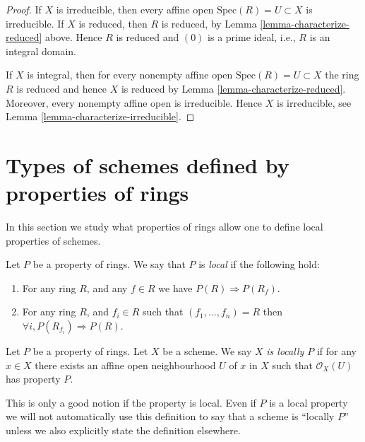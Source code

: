 \begin{proof}
If $X$ is irreducible, then every affine open $\text{Spec}(R) = U \subset X$
is irreducible. If $X$ is reduced, then $R$ is reduced, by
Lemma \ref{lemma-characterize-reduced} above. Hence $R$ is reduced
and $(0)$ is a prime ideal, i.e., $R$ is an integral domain.

\medskip\noindent
If $X$ is integral, then for every nonempty affine open
$\text{Spec}(R) = U \subset X$ the ring $R$ is reduced
and hence $X$ is reduced by Lemma \ref{lemma-characterize-reduced}.
Moreover, every nonempty affine open is irreducible.
Hence $X$ is irreducible, see Lemma \ref{lemma-characterize-irreducible}.
\end{proof}















\section{Types of schemes defined by properties of rings}
\label{section-properties-rings}

\noindent
In this section we study what properties of rings
allow one to define local properties of schemes.

\begin{definition}
\label{definition-property-local}
Let $P$ be a property of rings.
We say that $P$ is {\it local} if the following hold:
\begin{enumerate}
\item For any ring $R$, and any $f \in R$ we have
$P(R) \Rightarrow P(R_f)$.
\item For any ring $R$, and $f_i \in R$ such that
$(f_1, \ldots, f_n) = R$ then
$\forall i, P(R_{f_i}) \Rightarrow P(R)$.
\end{enumerate}
\end{definition}

\begin{definition}
\label{definition-locally-P}
Let $P$ be a property of rings. Let $X$ be a scheme.
We say $X$ {\it is locally $P$} if for any $x \in X$
there exists an affine open neighbourhood $U$ of $x$
in $X$ such that $\mathcal{O}_X(U)$ has property $P$.
\end{definition}

\noindent
This is only a good notion if the property is local.
Even if $P$ is a local property we will not
automatically use this definition to say that a scheme is
``locally $P$'' unless we also explicitly state the definition
elsewhere.

